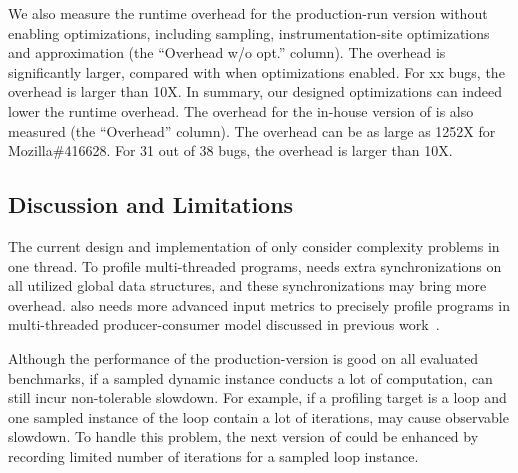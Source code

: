 We also measure the runtime overhead for the production-run 
version without enabling optimizations, 
including sampling, instrumentation-site optimizations
and approximation (the ``Overhead w/o opt.'' column). 
The overhead is significantly larger, compared with when optimizations enabled. 
For xx bugs, the overhead is larger than 10X. 
In summary, our designed optimizations can 
indeed lower the runtime overhead. 
The overhead for the in-house version 
of \Tool is also measured 
(the ``Overhead'' column). 
The overhead can be as large as 1252X for 
Mozilla\#416628.
For 31 out of 38 bugs, the overhead is larger than 10X. 



\subsection{Discussion and Limitations}
The current design and implementation of \Tool 
only consider complexity problems in one thread. 
To profile multi-threaded programs, 
\Tool needs extra synchronizations on all utilized global data structures, 
and these synchronizations may bring more overhead. 
\Tool also needs more advanced input metrics to precisely profile programs 
in multi-threaded producer-consumer 
model discussed in previous work~\cite{Aprof2}. 

Although the performance of the production-version 
is good on all evaluated benchmarks, 
if a sampled dynamic instance conducts a lot of computation, 
\Tool can still incur non-tolerable slowdown.
For example, if a profiling target is a loop and 
one sampled instance of the loop contain a lot of iterations, 
\Tool may cause observable slowdown. 
To handle this problem, the next version of \Tool could 
be enhanced by recording limited number of iterations for a sampled loop instance. 



